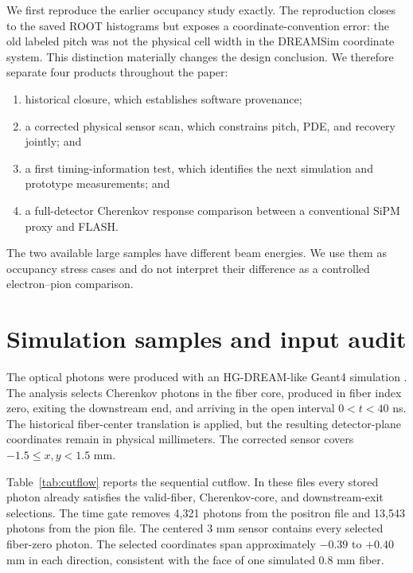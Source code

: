 \documentclass[a4paper,11pt]{article}
\begin{document}
We first reproduce the earlier occupancy study exactly. The reproduction
closes to the saved ROOT histograms but exposes a coordinate-convention error:
the old labeled pitch was not the physical cell width in the DREAMSim
coordinate system. This distinction materially changes the design conclusion.
We therefore separate four products throughout the paper:
\begin{enumerate}
  \item historical closure, which establishes software provenance;
  \item a corrected physical sensor scan, which constrains pitch, PDE, and
  recovery jointly; and
  \item a first timing-information test, which identifies the next simulation
  and prototype measurements; and
  \item a full-detector Cherenkov response comparison between a conventional
  SiPM proxy and FLASH.
\end{enumerate}

The two available large samples have different beam energies. We use them as
occupancy stress cases and do not interpret their difference as a controlled
electron--pion comparison.

\section{Simulation samples and input audit}
\label{sec:samples}

The optical photons were produced with an HG-DREAM-like Geant4 simulation
\cite{geant4}. The analysis selects Cherenkov photons in the fiber core,
produced in fiber index zero, exiting the downstream end, and arriving in the
open interval $0<t<40$ ns. The historical fiber-center translation is applied,
but the resulting detector-plane coordinates remain in physical millimeters.
The corrected sensor covers $-1.5\leq x,y<1.5$ mm.

Table~\ref{tab:cutflow} reports the sequential cutflow. In these files every
stored photon already satisfies the valid-fiber, Cherenkov-core, and
downstream-exit selections. The time gate removes 4,321 photons from the
positron file and 13,543 photons from the pion file. The centered 3 mm sensor
contains every selected fiber-zero photon. The selected coordinates span
approximately $-0.39$ to $+0.40$ mm in each direction, consistent with the
face of one simulated 0.8 mm fiber.
\end{document}
